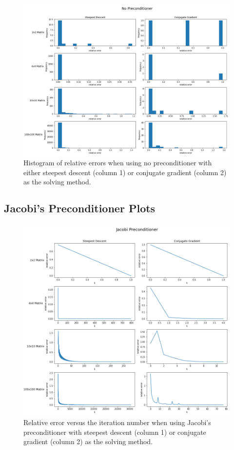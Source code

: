 \documentclass[11pt]{article}
\begin{document}
\begin{figure}[h!]
	\hspace*{-3cm}
	\centering
	\includegraphics[width=1.3\linewidth]{../figures/No Preconditioner Histogram}
	\caption{Histogram of relative errors when using no preconditioner with either steepest descent (column 1) or conjugate gradient (column 2) as the solving method.}
	\label{fig:HistNone}
\end{figure}
\clearpage

\subsection{Jacobi's Preconditioner Plots}
\begin{figure}[h!]
	\hspace*{-2cm}
	\centering
	\includegraphics[width=1.2\linewidth]{../figures/Jacobi Preconditioner}
	\caption{Relative error versus the iteration number when using Jacobi's preconditioner with steepest descent (column 1) or conjugate gradient (column 2) as the solving method.}
	\label{fig:Jacobi}
\end{figure}
\end{document}
